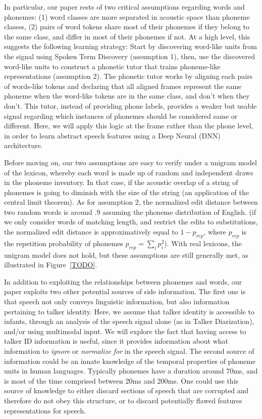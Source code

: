 \documentclass[a4paper]{article}
\begin{document}
In particular, our paper rests of two critical assumptions regarding words and phonemes: (1) word classes are more separated in acoustic space than phoneme classes, (2) pairs of word tokens share most of their phonemes if they belong to the same class, and differ in most of their phonemes if not. At a high level, this suggests the following learning strategy: Start by discovering word-like units from the signal using Spoken Term Discovery  (assumption 1), then, use the discovered word-like units to construct a phonetic tutor that trains phoneme-like representations (assumption 2). The phonetic tutor works by aligning each pairs of words-like tokens and declaring that all aligned frames represent the same phoneme when the word-like tokens are in the same class, and don't when they don't. This tutor, instead of providing phone labels, provides a weaker but usable signal regarding which instances of phonemes should be considered same or different. Here, we will apply this logic at the frame rather than the phone level, in order to learn abstract speech features using a Deep Neural (DNN) architecture.


Before moving on, our two assumptions are easy to verify under a unigram model of the lexicon, whereby each word is made up of random and independent draws in the phoneme inventory. In that case, if the acoustic overlap of a string of phonemes is going to diminish with the size of the string (an application of the central limit theorem). As for assumption 2, the normalized edit distance between two random words is around .9 assuming the phoneme distribution of English. (if we only consider words of matching length, and restrict the edits to substitutions, the normalized edit distance is approximatively equal to $1-p_{rep}$, where $p_{rep}$ is the repetition probability of phonemes $p_{rep}=\sum_i{p_i^2}$). With real lexicons, the unigram model does not hold, but these assumptions are still generally met, as illustrated in Figure~\ref{TODO}.

In addition to exploiting the relationships between phonemes and words, our paper exploits two other potential sources of side information. The first one is that speech not only conveys linguistic information, but also information pertaining to talker identity. Here, we assume that talker identity is accessible to infants, through an analysis of the speech signal alone (as in Talker Diarization), and/or using multimodal input. We will explore the fact that having access to talker ID information is useful, since it provides information about what information to \emph{ignore} or \emph{normalize for} in the speech signal. The second source of information could be an innate knowledge of the temporal properties of phoneme units in human languages. Typically phonemes have a duration around 70ms, and is most of the time comprised between 20ms and 200ms. One could use this source of knowledge to either discard sections of speech that are corrupted and therefore do not obey this structure, or to discard potentially flawed features representations for speech.
\end{document}
